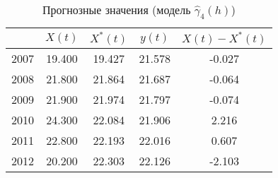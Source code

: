 \begin{table}[ht]
\centering
\begin{tabular}{r|cccc}
  \hline
 & $X(t)$ & $X^{*}(t)$ & $y(t)$ & $ X(t) - X^{*}(t) $ \\ 
  \hline
2007 & 19.400 & 19.427 & 21.578 & -0.027 \\ 
  2008 & 21.800 & 21.864 & 21.687 & -0.064 \\ 
  2009 & 21.900 & 21.974 & 21.797 & -0.074 \\ 
  2010 & 24.300 & 22.084 & 21.906 & 2.216 \\ 
  2011 & 22.800 & 22.193 & 22.016 & 0.607 \\ 
  2012 & 20.200 & 22.303 & 22.126 & -2.103 \\ 
   \hline
\end{tabular}
\caption{Прогнозные значения (модель $ \widehat{\gamma}_4(h) $)} 
\label{table:lin-fit-adapt-prediction}
\end{table}
